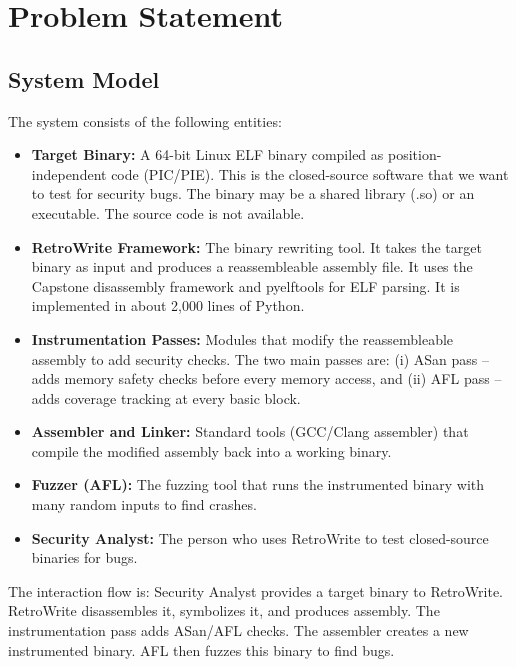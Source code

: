 \documentclass[10pt,a4paper]{article}
\begin{document}
\section{Problem Statement}

\subsection{System Model}

The system consists of the following entities:

\begin{itemize}
    \item \textbf{Target Binary:} A 64-bit Linux ELF binary compiled as position-independent code (PIC/PIE). This is the closed-source software that we want to test for security bugs. The binary may be a shared library (.so) or an executable. The source code is not available.

    \item \textbf{RetroWrite Framework:} The binary rewriting tool. It takes the target binary as input and produces a reassembleable assembly file. It uses the Capstone disassembly framework and pyelftools for ELF parsing. It is implemented in about 2,000 lines of Python.

    \item \textbf{Instrumentation Passes:} Modules that modify the reassembleable assembly to add security checks. The two main passes are: (i) ASan pass -- adds memory safety checks before every memory access, and (ii) AFL pass -- adds coverage tracking at every basic block.

    \item \textbf{Assembler and Linker:} Standard tools (GCC/Clang assembler) that compile the modified assembly back into a working binary.

    \item \textbf{Fuzzer (AFL):} The fuzzing tool that runs the instrumented binary with many random inputs to find crashes.

    \item \textbf{Security Analyst:} The person who uses RetroWrite to test closed-source binaries for bugs.
\end{itemize}

The interaction flow is: Security Analyst provides a target binary to RetroWrite. RetroWrite disassembles it, symbolizes it, and produces assembly. The instrumentation pass adds ASan/AFL checks. The assembler creates a new instrumented binary. AFL then fuzzes this binary to find bugs.
\end{document}
